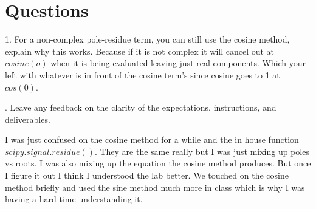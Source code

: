 \documentclass[12pt,a4paper]{article}
\begin{document}
\section{Questions}\label{sec:res}


1. For a non-complex pole-residue term, you can still use the cosine method, explain why this
works.\newline
Because if it is not complex it will cancel out at $cosine(o)$ when it is being evaluated leaving just real components. Which your left with  whatever is in front of the cosine term's since cosine goes to 1 at $cos(0)$.

. Leave any feedback on the clarity of the expectations, instructions, and deliverables.\newline

\noindent
I was just confused on the cosine method for a while and the in house function $scipy.signal.residue()$. They are the same really but I was just mixing up poles vs roots. I was also mixing up the equation the cosine method produces. But once I figure it out I think I understood the lab better. We touched on the cosine method briefly and used the sine method much more in class which is why I was having a hard time understanding it.







\end{document}
